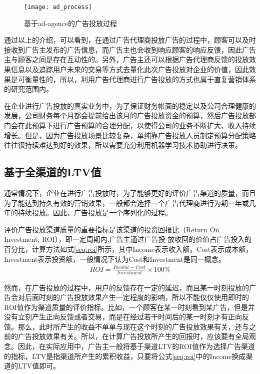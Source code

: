 \begin{figure}[htbp]
\centering
\texttt{[image: ad\_process]}
\caption{基于ad-agence的广告投放过程}
\label{fig:ad_process}
\end{figure}

通过以上的介绍，可以看到，在通过广告代理商投放广告的过程中，顾客可以及时接收到广告主发布的广告信息，而广告主也会收到响应顾客的响应反馈，因此广告主与顾客之间是存在互动性的。另外，广告主还可以根据广告代理商反馈的投放效果信息以及追踪用户未来的交易等方式去量化此次广告投放对企业的价值，因此效果是可衡量性的，所以，利用广告代理商进行广告投放的方式也属于直复营销体系的研究范围内。

在企业进行广告投放的真实业务中，为了保证财务帐面的稳定以及公司合理健康的发展，公司财务每个月都会提前给出该月的广告投放资金的预算，然后广告投放部门会在此预算下进行广告预算的合理分配，以使得公司的业务不断扩大、收入持续增长。但是，因为广告投放场景比较复杂，单纯靠广告投放人员制定预算分配策略往往很持续难达到好的效果，所以需要充分利用机器学习技术协助进行决策。

\subsection{基于全渠道的LTV值}
通常情况下，企业在进行广告投放时，为了能够更好的评价广告渠道的质量，而且为了能达到持久有效的营销效果，一般都会选择一个广告代理商进行为期一年或几年的持续投放。因此，广告投放是一个序列化的过程。

评价广告投放渠道质量的重要指标是该渠道的投资回报比（Return On Investment, ROI），即一定周期内,广告主通过广告投
放收回的价值占广告投入的百分比，计算方法如式\eqref{seq:roi}所示，其中Income表示收入额，Cost表示成本额，Investment表示投资额，一般情况下认为Cost和Investment是同一概念。
\begin{equation}\label{seq:roi}
\begin{aligned}
 ROI=\frac{Income-Cost}{Investment} \times 100\%
\end{aligned}
\end{equation}

然而，在广告投放的过程中，用户的反馈存在一定的延迟，而且某一时刻投放的广告会对后面时刻的广告投放效果产生一定程度的影响，所以不能仅仅使用即时的ROI值作为渠道质量的评价指标。比如，一个顾客在某一时刻看到某广告，但是并没有立刻产生正向反馈或者交易，而是在经过若干时间后的某一时刻才有正向反馈。那么，此时所产生的收益不单单与现在这个时刻的广告投放效果有关，还与之前的广告投放效果有关。所以，在计算广告投放所产生的回报时，应该要有全局观念。因此，在实际应用中，广告主一般将基于渠道LTV的ROI值作为选择广告渠道的指标，LTV是指渠道所产生的累积收益，只要将公式\eqref{seq:roi}中的Income换成渠道的LTV值即可。

